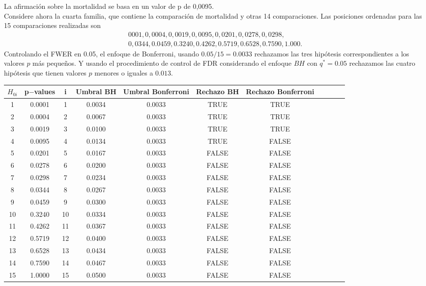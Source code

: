 \documentclass[11pt,letterpaper]{article}
\begin{document}
La afirmación sobre la mortalidad se basa en un valor de p de 0,0095.\\
Considere ahora la cuarta familia, que contiene la comparación de mortalidad y otras 14 comparaciones. Las posiciones ordenadas para las 15 comparaciones realizadas son \begin{align*}
0001, 0,0004, 0,0019, 0,0095, 0,0201, 0,0278, 0,0298,\\ 0,0344, 0.0459, 0.3240, 0.4262, 0.5719, 0.6528, 0.7590, 1.000.
\end{align*}
Controlando el FWER en 0.05, el enfoque de Bonferroni, usando $0.05 / 15 = 0.0033$ rechazamos las tres hipótesis correspondientes a los valores $p$ más pequeños. Y usando el procedimiento de control de FDR considerando el enfoque $BH$ con $q^* = 0.05$ rechazamos las cuatro hipótesis que tienen valores $p$ menores o iguales a $0.013$.

\begin{table}[H]
\begin{tabular}{ccccccccccc}
\hline
\hline
$H_{0i}$ & p$-$values & i &  Umbral BH & Umbral Bonferroni & Rechazo BH& Rechazo Bonferroni\\
\hline
\hline
1 &   0.0001&  1& 0.0034&       0.0033&       TRUE&               TRUE\\
2 &   0.0004&  2& 0.0067&       0.0033&       TRUE&               TRUE\\
3 &   0.0019&  3& 0.0100&       0.0033&       TRUE&               TRUE\\
4 &   0.0095&  4& 0.0134&       0.0033&       TRUE&              FALSE\\
5 &   0.0201&  5& 0.0167&       0.0033&      FALSE&              FALSE\\
6 &   0.0278&  6& 0.0200&       0.0033&      FALSE&              FALSE\\
7 &   0.0298&  7& 0.0234&       0.0033&      FALSE&              FALSE\\
8 &   0.0344&  8& 0.0267&       0.0033&      FALSE&              FALSE\\
9 &   0.0459&  9& 0.0300&       0.0033&      FALSE&              FALSE\\
10&   0.3240& 10& 0.0334&       0.0033&      FALSE&              FALSE\\
11&   0.4262& 11& 0.0367&       0.0033&      FALSE&              FALSE\\
12&   0.5719& 12& 0.0400&       0.0033&      FALSE&              FALSE\\
13&   0.6528& 13& 0.0434&       0.0033&      FALSE&              FALSE\\
14&   0.7590& 14& 0.0467&       0.0033&      FALSE&              FALSE\\
15&   1.0000& 15& 0.0500&       0.0033&      FALSE&              FALSE\\
\hline
\hline
\end{tabular}
\end{table}
\end{document}

